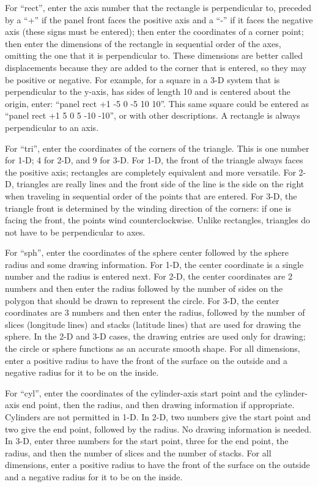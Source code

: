 \documentclass {scrbook}
\begin{document}
\begin{description}
For ``rect'', enter the axis number that the rectangle is perpendicular to, preceded by a ``+'' if the panel front faces the positive axis and a ``-'' if it faces the negative axis (these signs must be entered); then enter the coordinates of a corner point; then enter the dimensions of the rectangle in sequential order of the axes, omitting the one that it is perpendicular to. These dimensions are better called displacements because they are added to the corner that is entered, so they may be positive or negative. For example, for a square in a 3-D system that is perpendicular to the y-axis, has sides of length 10 and is centered about the origin, enter: ``panel rect +1 -5 0 -5 10 10''. This same square could be entered as ``panel rect +1 5 0 5 -10 -10'', or with other descriptions. A rectangle is always perpendicular to an axis.

For ``tri'', enter the coordinates of the corners of the triangle. This is one number for 1-D; 4 for 2-D, and 9 for 3-D. For 1-D, the front of the triangle always faces the positive axis; rectangles are completely equivalent and more versatile. For 2-D, triangles are really lines and the front side of the line is the side on the right when traveling in sequential order of the points that are entered. For 3-D, the triangle front is determined by the winding direction of the corners: if one is facing the front, the points wind counterclockwise. Unlike rectangles, triangles do not have to be perpendicular to axes.

For ``sph'', enter the coordinates of the sphere center followed by the sphere radius and some drawing information. For 1-D, the center coordinate is a single number and the radius is entered next. For 2-D, the center coordinates are 2 numbers and then enter the radius followed by the number of sides on the polygon that should be drawn to represent the circle. For 3-D, the center coordinates are 3 numbers and then enter the radius, followed by the number of slices (longitude lines) and stacks (latitude lines) that are used for drawing the sphere. In the 2-D and 3-D cases, the drawing entries are used only for drawing; the circle or sphere functions as an accurate smooth shape. For all dimensions, enter a positive radius to have the front of the surface on the outside and a negative radius for it to be on the inside.

For ``cyl'', enter the coordinates of the cylinder-axis start point and the cylinder-axis end point, then the radius, and then drawing information if appropriate. Cylinders are not permitted in 1-D. In 2-D, two numbers give the start point and two give the end point, followed by the radius. No drawing information is needed. In 3-D, enter three numbers for the start point, three for the end point, the radius, and then the number of slices and the number of stacks. For all dimensions, enter a positive radius to have the front of the surface on the outside and a negative radius for it to be on the inside.


\end{description}
\end{document}
